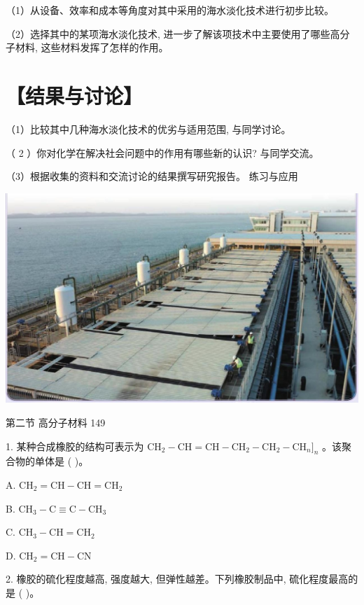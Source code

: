 \documentclass[10pt]{article}
\begin{document}
（1）从设备、效率和成本等角度对其中采用的海水淡化技术进行初步比较。

（2）选择其中的某项海水淡化技术, 进一步了解该项技术中主要使用了哪些高分子材料, 这些材料发挥了怎样的作用。

\section*{【结果与讨论】}

（1）比较其中几种海水淡化技术的优劣与适用范围, 与同学讨论。

（ 2 ）你对化学在解决社会问题中的作用有哪些新的认识? 与同学交流。

（3）根据收集的资料和交流讨论的结果撰写研究报告。 练习与应用

\begin{center}
\includegraphics[max width=1.0\textwidth]{images/0190efc5-b58a-7c43-bfb0-e0a030df9cfd_154_157748.jpg}
\end{center}

第二节 高分子材料 149

1. 某种合成橡胶的结构可表示为 \({\mathrm{{CH}}}_{2} - \mathrm{{CH}} = \mathrm{{CH}} - {\mathrm{{CH}}}_{2} - {\mathrm{{CH}}}_{2} - {\mathrm{{CH}}}_{n}{\rbrack }_{n}\) 。该聚合物的单体是 ( )。

A. \({\mathrm{{CH}}}_{2} = \mathrm{{CH}} - \mathrm{{CH}} = {\mathrm{{CH}}}_{2}\)

B. \({\mathrm{{CH}}}_{3} - \mathrm{C} \equiv \mathrm{C} - {\mathrm{{CH}}}_{3}\)

C. \({\mathrm{{CH}}}_{3} - \mathrm{{CH}} = {\mathrm{{CH}}}_{2}\)

D. \({\mathrm{{CH}}}_{2} = \mathrm{{CH}} - \mathrm{{CN}}\)

2. 橡胶的硫化程度越高, 强度越大, 但弹性越差。下列橡胶制品中, 硫化程度最高的是 ( )。
\end{document}
